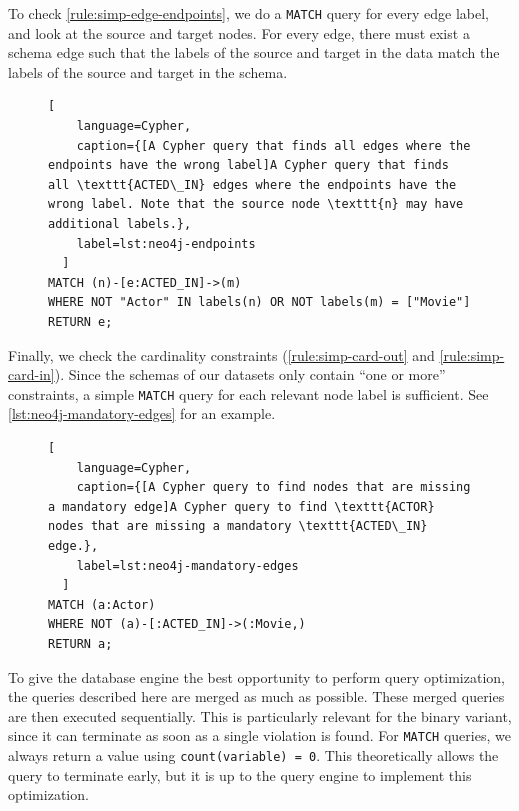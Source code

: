 \documentclass{report}
\theoremstyle{definition}
\begin{document}
To check \autoref{rule:simp-edge-endpoints}, we do a \texttt{MATCH} query for every edge label, and look at the source and target nodes. For every edge, there must exist a schema edge such that the labels of the source and target in the data match the labels of the source and target in the schema.

\begin{figure}[H]
  \begin{lstlisting}[
    language=Cypher,
    caption={[A Cypher query that finds all edges where the endpoints have the wrong label]A Cypher query that finds all \texttt{ACTED\_IN} edges where the endpoints have the wrong label. Note that the source node \texttt{n} may have additional labels.},
    label=lst:neo4j-endpoints
  ]
MATCH (n)-[e:ACTED_IN]->(m)
WHERE NOT "Actor" IN labels(n) OR NOT labels(m) = ["Movie"]
RETURN e;
  \end{lstlisting}
\end{figure}

Finally, we check the cardinality constraints (\autoref{rule:simp-card-out} and \ref{rule:simp-card-in}). Since the schemas of our datasets only contain ``one or more'' constraints, a simple \texttt{MATCH} query for each relevant node label is sufficient. See \autoref{lst:neo4j-mandatory-edges} for an example.

\begin{figure}[H]
  \begin{lstlisting}[
    language=Cypher,
    caption={[A Cypher query to find nodes that are missing a mandatory edge]A Cypher query to find \texttt{ACTOR} nodes that are missing a mandatory \texttt{ACTED\_IN} edge.},
    label=lst:neo4j-mandatory-edges
  ]
MATCH (a:Actor)
WHERE NOT (a)-[:ACTED_IN]->(:Movie,)
RETURN a;
  \end{lstlisting}
\end{figure}

To give the database engine the best opportunity to perform query optimization, the queries described here are merged as much as possible. These merged queries are then executed sequentially. This is particularly relevant for the binary variant, since it can terminate as soon as a single violation is found. For \texttt{MATCH} queries, we always return a value using \texttt{count(variable) = 0}. This theoretically allows the query to terminate early, but it is up to the query engine to implement this optimization.
\end{document}
